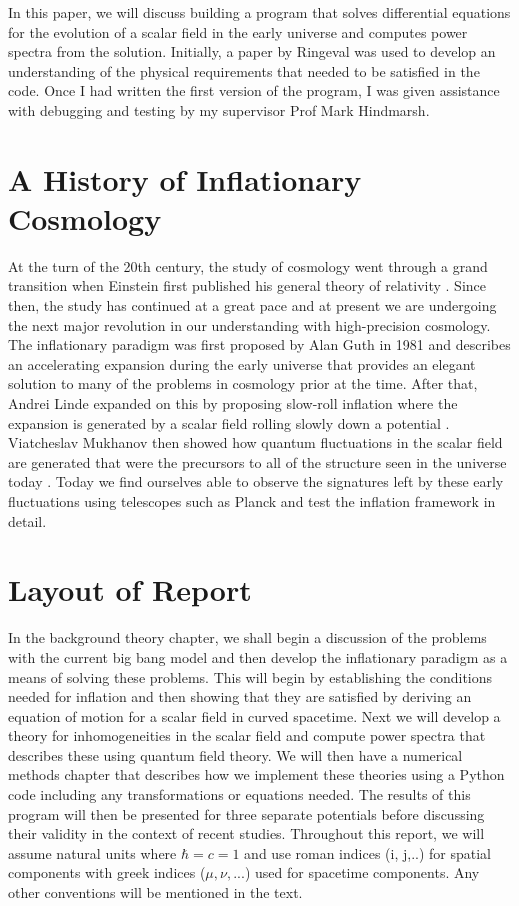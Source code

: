 \documentclass[a4paper,12pt,twoside]{report}
\begin{document}
In this paper, we will discuss building a program that solves differential equations for the evolution of a scalar field in the early universe and computes power spectra from the solution. Initially, a paper by Ringeval \cite{Ringeval:2007am} was used to develop an understanding of the physical requirements that needed to be satisfied in the code. Once I had written the first version of the program, I was given assistance with debugging and testing by my supervisor Prof Mark Hindmarsh.

\section{A History of Inflationary Cosmology} \label{sec:HistInflatCosmo}

At the turn of the 20th century, the study of cosmology went through a grand transition when Einstein first published his general theory of relativity \cite{Einstein:1916vd}. Since then, the study has continued at a great pace and at present we are undergoing the next major revolution in our understanding with high-precision cosmology. The inflationary paradigm was first proposed by Alan Guth in 1981 \cite{Guth:1980zm} and describes an accelerating expansion during the early universe that provides an elegant solution to many of the problems in cosmology prior at the time. After that, Andrei Linde expanded on this by proposing slow-roll inflation where the expansion is generated by a scalar field rolling slowly down a potential \cite{Linde:1981mu}. Viatcheslav Mukhanov then showed how quantum fluctuations in the scalar field are generated that were the precursors to all of the structure seen in the universe today \cite{Mukhanov:1981xt}. Today we find ourselves able to observe the signatures left by these early fluctuations using telescopes such as Planck and test the inflation framework in detail.

\section{Layout of Report} \label{sec:LayReport}

In the background theory chapter, we shall begin a discussion of the problems with the current big bang model and then develop the inflationary paradigm as a means of solving these problems. This will begin by establishing the conditions needed for inflation and then showing that they are satisfied by deriving an equation of motion for a scalar field in curved spacetime. Next we will develop a theory for inhomogeneities in the scalar field and compute power spectra that describes these using quantum field theory. We will then have a numerical methods chapter that describes how we implement these theories using a Python code including any transformations or equations needed. The results of this program will then be presented for three separate potentials before discussing their validity in the context of recent studies. Throughout this report, we will assume natural units where $\hbar = c = 1$ and use roman indices (i, j,..) for spatial components with greek indices ($\mu, \nu,...$) used for spacetime components. Any other conventions will be mentioned in the text.
\end{document}
